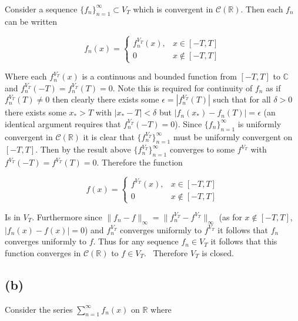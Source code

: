 \documentclass{article}
\begin{document}
\paragraph{}
Consider a sequence $\{f_n\}_{n=1}^\infty \subset V_T$ which is convergent in $\mathcal{C}(\mathbb{R})$. Then each $f_n$ can be written 

\begin{equation*}
	f_n(x) = 
	\begin{cases}
		f_n^{V_T}(x),&  x \in [-T,T] \\
		0 & x \notin [-T,T]
	\end{cases}
\end{equation*}

Where each $f_n^{V_T}(x)$ is a continuous and bounded function from $[-T,T]$ to $\mathbb{C}$ and 
$f_n^{V_T}(-T) = f_n^{V_T}(T) = 0$. Note this is required for continuity of $f_n$ as if 
$f_n^{V_T}(T) \neq 0$ then clearly there exists some $\epsilon = |f_n^{V_T}(T)|$ such that 
for all $\delta > 0$ there exists some $x_* > T$ with $|x_* - T| < \delta$ but $|f_n(x_*) - f_n(T)| = \epsilon$ 
(an identical argument requires that $f_n^{V_T}(-T) = 0$). Since 
$\{f_n\}_{n=1}^\infty$ is uniformly convergent in $\mathcal{C}(\mathbb{R})$ 
it is clear that $\{f_n^{V_T}\}_{n=1}^\infty$ must be uniformly convergent on $[-T,T]$. Then by the result above 
$\{f_n^{V_T}\}_{n=1}^\infty$ converges to some $f^{V_T}$ with $f^{V_T}(-T) = f^{V_T}(T) = 0$. Therefore the function 

\begin{equation*}
	f(x) = 
	\begin{cases}
		f^{V_T}(x),&  x \in [-T,T] \\
		0 & x \notin [-T,T]
	\end{cases}
\end{equation*}

Is in $V_T$. Furthermore since $\|f_n - f\|_\infty = \|f_n^{V_T} - f^{V_T}\|_\infty$ (as for $x \notin [-T,T]$, $|f_n(x) - f(x)| = 0$) and $f_n^{V_T}$ converges 
uniformly to $f^{V_T}$ it follows that $f_n$ converges uniformly to $f$. Thus for any sequence 
$f_n \in V_T$ it follows that this function converges in $\mathcal{C}(\mathbb{R})$ to $f \in V_T$. \
Therefore $V_T$ is closed.

\subsection*{(b)}
Consider the series $\sum_{n=1}^\infty f_n(x)$ on $\mathbb{R}$ where 
\end{document}
